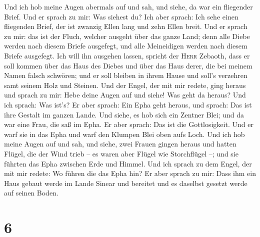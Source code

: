  Und ich hob meine Augen abermals auf und sah, und siehe,
da war ein fliegender Brief.  Und er sprach zu mir: Was
siehest du? Ich aber sprach: Ich sehe einen fliegenden Brief, der ist
zwanzig Ellen lang und zehn Ellen breit.  Und er sprach zu
mir: das ist der Fluch, welcher ausgeht über das ganze Land; denn alle
Diebe werden nach diesem Briefe ausgefegt, und alle Meineidigen werden
nach diesem Briefe ausgefegt.  Ich will ihn ausgehen
lassen, spricht der \textsc{Herr} Zebaoth, dass er soll kommen über das
Haus des Diebes und über das Haus derer, die bei meinem Namen falsch
schwören; und er soll bleiben in ihrem Hause und soll's verzehren samt
seinem Holz und Steinen.  Und der Engel, der mit mir
redete, ging heraus und sprach zu mir: Hebe deine Augen auf und siehe!
Was geht da heraus?  Und ich sprach: Was ist's? Er aber
sprach: Ein Epha geht heraus, und sprach: Das ist ihre Gestalt im ganzen
Lande.  Und siehe, es hob sich ein Zentner Blei; und da
war eine Frau, die saß im Epha.  Er aber sprach: Das ist
die Gottlosigkeit. Und er warf sie in das Epha und warf den Klumpen Blei
oben aufs Loch.  Und ich hob meine Augen auf und sah, und
siehe, zwei Frauen gingen heraus und hatten Flügel, die der Wind trieb
-- es waren aber Flügel wie Storchflügel --; und sie führten das Epha
zwischen Erde und Himmel.  Und ich sprach zu dem Engel,
der mit mir redete: Wo führen die das Epha hin?  Er aber
sprach zu mir: Dass ihm ein Haus gebaut werde im Lande Sinear und
bereitet und es daselbst gesetzt werde auf seinen Boden.

\hypertarget{section-5}{%
\section{6}\label{section-5}}

